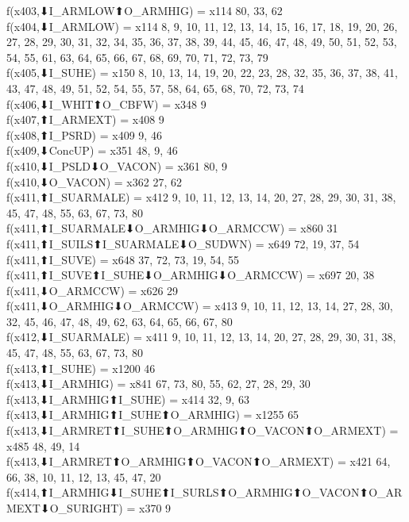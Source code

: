 f(x403,⬇I_ARMLOW⬆O_ARMHIG) = x114 {80, 33, 62} \\
f(x404,⬇I_ARMLOW) = x114 {8, 9, 10, 11, 12, 13, 14, 15, 16, 17, 18, 19, 20, 26, 27, 28, 29, 30, 31, 32, 34, 35, 36, 37, 38, 39, 44, 45, 46, 47, 48, 49, 50, 51, 52, 53, 54, 55, 61, 63, 64, 65, 66, 67, 68, 69, 70, 71, 72, 73, 79} \\
f(x405,⬇I_SUHE) = x150 {8, 10, 13, 14, 19, 20, 22, 23, 28, 32, 35, 36, 37, 38, 41, 43, 47, 48, 49, 51, 52, 54, 55, 57, 58, 64, 65, 68, 70, 72, 73, 74} \\
f(x406,⬇I_WHIT⬆O_CBFW) = x348 {9} \\
f(x407,⬆I_ARMEXT) = x408 {9} \\
f(x408,⬆I_PSRD) = x409 {9, 46} \\
f(x409,⬇ConcUP) = x351 {48, 9, 46} \\
f(x410,⬇I_PSLD⬇O_VACON) = x361 {80, 9} \\
f(x410,⬇O_VACON) = x362 {27, 62} \\
f(x411,⬆I_SUARMALE) = x412 {9, 10, 11, 12, 13, 14, 20, 27, 28, 29, 30, 31, 38, 45, 47, 48, 55, 63, 67, 73, 80} \\
f(x411,⬆I_SUARMALE⬇O_ARMHIG⬇O_ARMCCW) = x860 {31} \\
f(x411,⬆I_SUILS⬆I_SUARMALE⬇O_SUDWN) = x649 {72, 19, 37, 54} \\
f(x411,⬆I_SUVE) = x648 {37, 72, 73, 19, 54, 55} \\
f(x411,⬆I_SUVE⬆I_SUHE⬇O_ARMHIG⬇O_ARMCCW) = x697 {20, 38} \\
f(x411,⬇O_ARMCCW) = x626 {29} \\
f(x411,⬇O_ARMHIG⬇O_ARMCCW) = x413 {9, 10, 11, 12, 13, 14, 27, 28, 30, 32, 45, 46, 47, 48, 49, 62, 63, 64, 65, 66, 67, 80} \\
f(x412,⬇I_SUARMALE) = x411 {9, 10, 11, 12, 13, 14, 20, 27, 28, 29, 30, 31, 38, 45, 47, 48, 55, 63, 67, 73, 80} \\
f(x413,⬆I_SUHE) = x1200 {46} \\
f(x413,⬇I_ARMHIG) = x841 {67, 73, 80, 55, 62, 27, 28, 29, 30} \\
f(x413,⬇I_ARMHIG⬆I_SUHE) = x414 {32, 9, 63} \\
f(x413,⬇I_ARMHIG⬆I_SUHE⬆O_ARMHIG) = x1255 {65} \\
f(x413,⬇I_ARMRET⬆I_SUHE⬆O_ARMHIG⬆O_VACON⬆O_ARMEXT) = x485 {48, 49, 14} \\
f(x413,⬇I_ARMRET⬆O_ARMHIG⬆O_VACON⬆O_ARMEXT) = x421 {64, 66, 38, 10, 11, 12, 13, 45, 47, 20} \\
f(x414,⬆I_ARMHIG⬇I_SUHE⬆I_SURLS⬆O_ARMHIG⬆O_VACON⬆O_ARMEXT⬇O_SURIGHT) = x370 {9} \\
